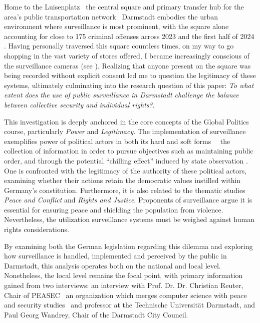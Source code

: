 \documentclass[12pt]{article}
\begin{document}
	Home to the Luisenplatz \textemdash\ the central square and primary transfer hub for the area's public transportation network \textemdash\ Darmstadt embodies the urban environment where surveillance is most prominent, with the square alone accounting for close to 175 criminal offenses across 2023 and the first half of 2024 \parencite{schonbein_weapon_2025}. Having personally traversed this square countless times, on my way to go shopping in the vast variety of stores offered, I became increasingly conscious of the surveillance cameras (see ). Realizing that anyone present on the square was being recorded without explicit consent led me to question the legitimacy of these systems, ultimately culminating into the research question of this paper: \textit{To what extent does the use of public surveillance in Darmstadt challenge the balance between collective security and individual rights?}.
	
	This investigation is deeply anchored in the core concepts of the Global Politics course, particularly \textit{Power} and \textit{Legitimacy}. The implementation of surveillance exemplifies power of political actors in both its hard and soft forms \parencite{courseCompanion2024}\ \textemdash\ the collection of information in order to pursue objectives such as maintaining public order, and through the potential ``chilling effect'' induced by state observation \parencite{murray2024}. One is confronted with the legitimacy of the authority of these political actors, examining whether their actions retain the democratic values instilled within Germany's constitution. Furthermore, it is also related to the thematic studies \textit{Peace and Conflict} and \textit{Rights and Justice}. Proponents of surveillance argue it is essential for ensuring peace and shielding the population from violence. Nevertheless, the utilization surveillance systems must be weighed against human rights considerations.
	
	By examining both the German legislation regarding this dilemma and exploring how surveillance is handled, implemented and perceived by the public in Darmstadt, this analysis operates both on the national and local level. Nonetheless, the local level remains the focal point, with primary information gained from two interviews: an interview with Prof. Dr. Dr. Christian Reuter, Chair of PEASEC \textemdash\ an organization which merges computer science with peace and security studies \parencite{noauthor_peasec_2025} \textemdash\ and professor at the Technische Universität Darmstadt, and Paul Georg Wandrey, Chair of the Darmstadt City Council.
	
\end{document}
